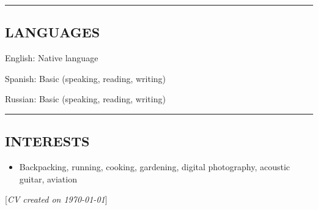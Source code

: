 \documentclass[10pt,letterpaper,MMMyyyy,nonstop]{simpleresumecv}
\newcommand{\CVNote}{CV created on {\today}}
\newenvironment{indentsection}[1]%
{\begin{list}{}%
    {\setlength{\leftmargin}{#1}}%
    \item[]%
}
{\end{list}}
\begin{document}
\hrule
\vspace{-0.4em}
\subsection*{LANGUAGES}

\begin{indentsection}{\parindent}
    \begin{description*}
        \item[English:]
        Native language
        \item[Spanish:]
        Basic (speaking, reading, writing)
        \item[Russian:]
        Basic (speaking, reading, writing)
    \end{description*}
\end{indentsection}





\hrule
\vspace{-0.4em}
\subsection*{INTERESTS}

\begin{itemize}
    \item Backpacking, running, cooking, gardening, digital photography, acoustic guitar, aviation
\end{itemize}



\null\hfill%
[\textit{\CVNote}]%
\hspace{2.0mm}\null
\end{document}
